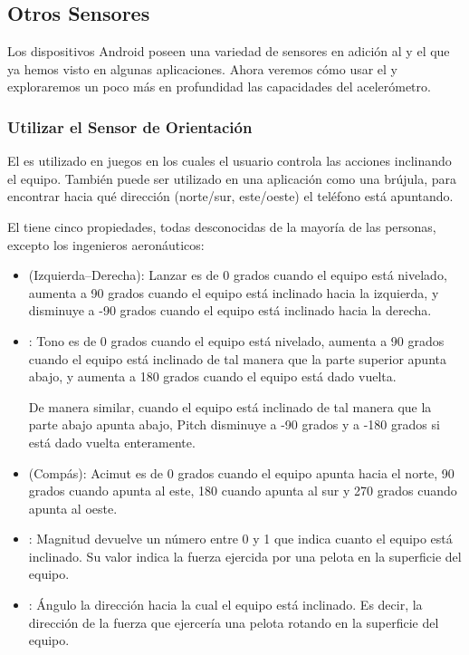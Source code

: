 \subsection*{Otros Sensores}

Los dispositivos Android poseen una variedad de sensores en adición al
 y el  que ya
hemos visto en algunas aplicaciones. Ahora veremos cómo usar el
 y exploraremos un poco más en
profundidad las capacidades del acelerómetro.


\subsubsection*{Utilizar el Sensor de Orientación}

El  es utilizado en juegos en los
cuales el usuario controla las acciones inclinando el equipo. También
puede ser utilizado en una aplicación como una brújula, para encontrar
hacia qué dirección (norte/sur, este/oeste) el teléfono está
apuntando.


El  tiene cinco propiedades, todas
desconocidas de la mayoría de las personas, excepto los ingenieros
aeronáuticos:

\begin{itemize}
\item {} (Izquierda--Derecha): Lanzar es de 0 grados
  cuando el equipo está nivelado, aumenta a 90 grados cuando el equipo
  está inclinado hacia la izquierda, y disminuye a -90 grados cuando
  el equipo está inclinado hacia la derecha.

\item {}: Tono es de 0 grados cuando el equipo está
  nivelado, aumenta a 90 grados cuando el equipo está inclinado de tal
  manera que la parte superior apunta abajo, y aumenta a 180 grados
  cuando el equipo está dado vuelta.

  De manera similar, cuando el equipo está inclinado de tal manera que
  la parte abajo apunta abajo, Pitch disminuye a -90 grados y a -180
  grados si está dado vuelta enteramente.

\item {} (Compás): Acimut es de 0 grados cuando el
  equipo apunta hacia el norte, 90 grados cuando apunta al este, 180
  cuando apunta al sur y 270 grados cuando apunta al oeste.

\item {}: Magnitud devuelve un número entre 0 y 1 que
  indica cuanto el equipo está inclinado. Su valor indica la fuerza
  ejercida por una pelota en la superficie del equipo.

\item {}: Ángulo la dirección hacia la cual el equipo
  está inclinado. Es decir, la dirección de la fuerza que ejercería
  una pelota rotando en la superficie del equipo.

\end{itemize}

